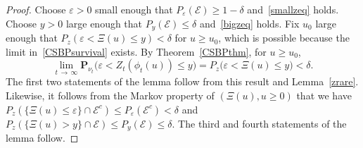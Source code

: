 \documentclass[AHL,Unicode,longabstracts,published]{cedram}
\newcommand*\eps{\varepsilon}
\renewcommand*\P{\mathbf{P}}
\newcommand{\clE}{\mathcal{E}}
\newcommand{\1} {\mathds{1}}
\begin{document}
\begin{proof}
Choose $\eps > 0$ small enough that $P_{\eps}(\clE) \geq 1 - \delta$ and~\eqref{smallzeq} holds. Choose $y > 0$ large enough that $P_y(\clE) \leq \delta$ and~\eqref{bigzeq} holds. Fix $u_0$ large enough that $P_z(\eps < \Xi(u) \leq y) < \delta$ for $u \geq u_0$, which is possible because the limit in~\eqref{CSBPsurvival} exists. By Theorem~\ref{CSBPthm}, for $u \geq u_0$,
\[
\lim_{t\,\rightarrow\,\infty} \P_{\nu_t}\big(\eps < Z_t(\phi_t(u)) \leq y\big) = P_z\big(\eps < \Xi(u) \leq y\big) < \delta.
\]
The first two statements of the lemma follow from this result and Lemma~\ref{zrare}. Likewise, it follows from the Markov property of $(\Xi(u), u \geq 0)$ that we have $P_z(\{\Xi(u) \leq \eps\} \cap \clE^c) \leq P_{\eps}(\clE^c) < \delta$ and $P_z(\{\Xi(u) > y\} \cap \clE) \leq P_y(\clE) \leq \delta$. The third and fourth statements of the lemma follow.
\end{proof}
\end{document}
